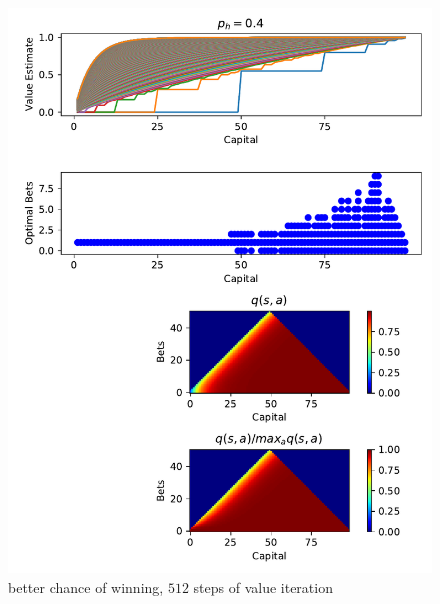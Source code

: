 \documentclass{article}
\begin{document}
\begin{figure}
	\includegraphics[width=\textwidth]{less_unfair_more_runs}
	\centering
	\caption{\label{fig:less_unfair_more_runs}better chance of winning, $512$ steps of value iteration}
\end{figure} 
\end{document}

